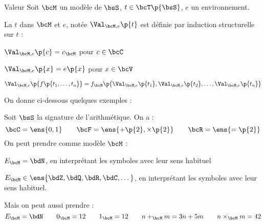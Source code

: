    \begin{definition}{Valeur}{}
        Soit $\bcM$ un modèle de $\bsS$, $t \in \bcT\p{\bsS}$, $e$ un environnement.
        
        La  $t$ dans $\bcM$ et $e$, notée $\Val_{\bcM, e}\p{t}$ est définie par induction structurelle sur $t$ :
        \begin{enumerate}
            \itast $\Val_{\bcM, e}\p{c} = c_\bcM$ pour $c \in \bcC$
            
            \itast $\Val_{\bcM, e}\p{x} = e\p{x}$ pour $x \in \bcV$
            
            \itast $\Val_{\bcM, e}\p{f\p{t_1, \dots, t_n}} = f_\bcM\p{\Val_{\bcM, e}\p{t_1},\Val_{\bcM, e}\p{t_2},\dots,\Val_{\bcM, e}\p{t_n}}$
        \end{enumerate}
    \end{definition}
    
    On donne ci-dessous quelques exemples :
    
    \begin{example}{}{}
        Soit $\bsS$ la signature de l'arithmétique. On a :
        \[ \bcC = \ens{0, 1} \qquad \bcF = \ens{+ \p{2}, \times \p{2}}\qquad \bcR = \ens{= \p{2}}\]
        On peut prendre comme modèle $\bcM$ :
        \begin{enumerate}
            \itt $E_\bcM = \bdN$, en interprétant les symboles avec leur sens habituel
            
            \itt $E_\bcM \in \ens{\bdZ, \bdQ, \bdR, \bdC, \dots}$, en interprétant les symboles avec leur sens habituel.
            
            \itt Mais on peut aussi prendre :
            \[ E_\bcM = \bdN\qquad 0_\bcM = 12\qquad 1_\bcM = 12\qquad n +_\bcM m = 3n + 5m\qquad n \times_\bcM m = 42\]
        \end{enumerate}
    \end{example}
    

